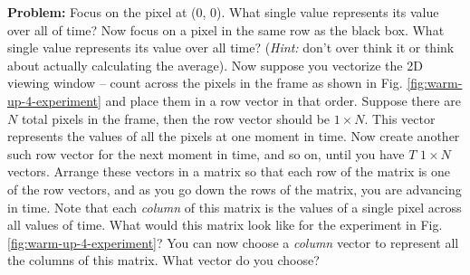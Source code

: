 \textbf{Problem:} Focus on the pixel at (0, 0). What single value represents its value over all of time? Now focus on a pixel in the same row as the black box. What single value represents its value over all time? (\textit{Hint:} don't over think it or think about actually calculating the average). Now suppose you vectorize the 2D viewing window -- count across the pixels in the frame as shown in Fig. \ref{fig:warm-up-4-experiment} and place them in a row vector in that order. Suppose there are $N$ total pixels in the frame, then the row vector should be $1 \times N$. This vector represents the values of all the pixels at one moment in time. Now create another such row vector for the next moment in time, and so on, until you have $T$ $1 \times N$ vectors. Arrange these vectors in a matrix so that each row of the matrix is one of the row vectors, and as you go down the rows of the matrix, you are advancing in time. Note that each \textit{column} of this matrix is the values of a single pixel across all values of time. What would this matrix look like for the experiment in Fig. \ref{fig:warm-up-4-experiment}? You can now choose a \textit{column} vector to represent all the columns of this matrix. What vector do you choose?